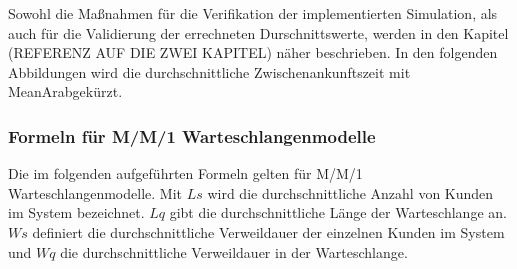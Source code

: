 Sowohl die Maßnahmen für die Verifikation der implementierten Simulation, als auch für die Validierung der errechneten Durschnittswerte, werden in den Kapitel (REFERENZ AUF DIE ZWEI KAPITEL) näher beschrieben. In den folgenden Abbildungen wird die durchschnittliche Zwischenankunftszeit mit \glqq MeanAr\grqq abgekürzt.

%
%
%

\subsubsection{Formeln für M/M/1 Warteschlangenmodelle}
\label{Formeln}
Die im folgenden aufgeführten Formeln gelten für M/M/1 Warteschlangenmodelle. Mit $Ls$ wird die durchschnittliche Anzahl von Kunden im System bezeichnet. $Lq$ gibt die durchschnittliche Länge der Warteschlange an. $Ws$ definiert die durchschnittliche Verweildauer der einzelnen Kunden im System und $Wq$ die durchschnittliche Verweildauer in der Warteschlange. 

